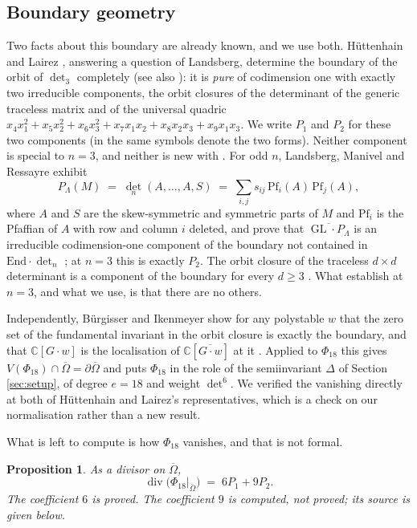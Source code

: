 \documentclass[11pt,reqno]{amsart}
\theoremstyle{plain}
\newtheorem{proposition}[theorem]{Proposition}
\theoremstyle{definition}
\DeclareMathOperator{\GL}{GL}
\newcommand{\cO}{\overline{\Omega}}
\newcommand{\bC}{\mathbb{C}}
\begin{document}
\subsection*{Boundary geometry}

Two facts about this boundary are already known, and we use both.
H\"uttenhain and Lairez \cite{HL}, answering a question of Landsberg,
determine the boundary of the orbit of $\det_3$ completely (see also
\cite{Hue}): it is \emph{pure}
of codimension one with exactly two irreducible components, the orbit closures of the determinant of the generic
traceless matrix and of the universal quadric
$x_4x_1^{2}+x_5x_2^{2}+x_6x_3^{2}+x_7x_1x_2+x_8x_2x_3+x_9x_1x_3$.  We write
$P_1$ and $P_2$ for these two components (in \cite{HL} the same symbols denote
the two forms).  Neither component is special to $n=3$, and neither is new
with \cite{HL}.  For odd $n$, Landsberg, Manivel and Ressayre exhibit
\[
  P_\Lambda(M)\;=\;\det_n(A,\dots,A,S)
  \;=\;\sum_{i,j}s_{ij}\,\mathrm{Pf}_i(A)\,\mathrm{Pf}_j(A),
\]
where $A$ and $S$ are the skew-symmetric and symmetric parts of $M$ and
$\mathrm{Pf}_i$ is the Pfaffian of $A$ with row and column $i$ deleted, and
prove that $\overline{\GL\cdot P_\Lambda}$ is an irreducible codimension-one
component of the boundary not contained in $\mathrm{End}\cdot\det_n$
\cite[Prop.~3.5.1]{LMR}; at $n=3$ this is exactly $P_2$.  The orbit closure of
the traceless $d\times d$ determinant is a component of the boundary for every
$d\ge3$ \cite[Cor.~8.3.2]{Hue}.  What \cite{HL} establish at $n=3$, and what
we use, is that there are no others.

Independently, B\"urgisser and Ikenmeyer show for any
polystable $w$ that the zero set of the fundamental invariant in the orbit
closure is exactly the boundary, and that $\bC[G\cdot w]$ is the localisation
of $\bC[\overline{G\cdot w}]$ at it \cite[Prop.~3.9]{BI}.  Applied to
$\Phi_{18}$ this gives $V(\Phi_{18})\cap\cO=\partial\cO$ and puts
$\Phi_{18}$ in the role of the semiinvariant $\Delta$ of Section
\ref{sec:setup}, of degree $e=18$ and weight $\det^{6}$.  We verified the
vanishing directly at both of H\"uttenhain and Lairez's representatives, which
is a check on our normalisation rather than a new result.

What is left to compute is how $\Phi_{18}$ vanishes, and that is not formal.

\begin{proposition}\label{prop:divisor}
As a divisor on $\cO$,
\[
  \operatorname{div}\big(\Phi_{18}|_{\cO}\big)\;=\;6P_1+9P_2 .
\]
The coefficient $6$ is proved.  The coefficient $9$ is computed, not proved;
its source is given below.
\end{proposition}
\end{document}
